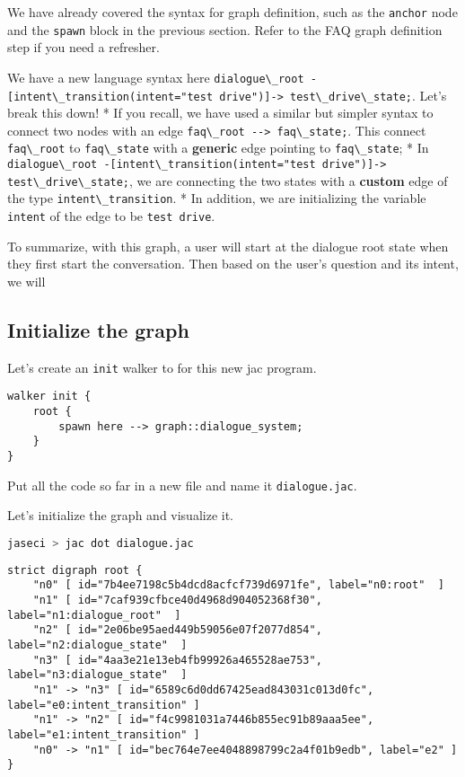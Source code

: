 We have already covered the syntax for graph definition, such as the
\passthrough{\lstinline!anchor!} node and the
\passthrough{\lstinline!spawn!} block in the previous section. Refer to
the FAQ graph definition step if you need a refresher.

We have a new language syntax here
\passthrough{\lstinline!dialogue\_root -[intent\_transition(intent="test drive")]-> test\_drive\_state;!}.
Let's break this down! * If you recall, we have used a similar but
simpler syntax to connect two nodes with an edge
\passthrough{\lstinline!faq\_root --> faq\_state;!}. This connect
\passthrough{\lstinline!faq\_root!} to
\passthrough{\lstinline!faq\_state!} with a \textbf{generic} edge
pointing to \passthrough{\lstinline!faq\_state!}; * In
\passthrough{\lstinline!dialogue\_root -[intent\_transition(intent="test drive")]-> test\_drive\_state;!},
we are connecting the two states with a \textbf{custom} edge of the type
\passthrough{\lstinline!intent\_transition!}. * In addition, we are
initializing the variable \passthrough{\lstinline!intent!} of the edge
to be \passthrough{\lstinline!test drive!}.

To summarize, with this graph, a user will start at the dialogue root
state when they first start the conversation. Then based on the user's
question and its intent, we will

\hypertarget{initialize-the-graph-1}{%
\subsection{Initialize the graph}\label{initialize-the-graph-1}}

Let's create an \passthrough{\lstinline!init!} walker to for this new
jac program.

\begin{lstlisting}
walker init {
    root {
        spawn here --> graph::dialogue_system;
    }
}
\end{lstlisting}

Put all the code so far in a new file and name it
\passthrough{\lstinline!dialogue.jac!}.

Let's initialize the graph and visualize it.

\begin{lstlisting}[language=bash]
jaseci > jac dot dialogue.jac
\end{lstlisting}

\begin{lstlisting}
strict digraph root {
    "n0" [ id="7b4ee7198c5b4dcd8acfcf739d6971fe", label="n0:root"  ]
    "n1" [ id="7caf939cfbce40d4968d904052368f30", label="n1:dialogue_root"  ]
    "n2" [ id="2e06be95aed449b59056e07f2077d854", label="n2:dialogue_state"  ]
    "n3" [ id="4aa3e21e13eb4fb99926a465528ae753", label="n3:dialogue_state"  ]
    "n1" -> "n3" [ id="6589c6d0dd67425ead843031c013d0fc", label="e0:intent_transition" ]
    "n1" -> "n2" [ id="f4c9981031a7446b855ec91b89aaa5ee", label="e1:intent_transition" ]
    "n0" -> "n1" [ id="bec764e7ee4048898799c2a4f01b9edb", label="e2" ]
}
\end{lstlisting}

